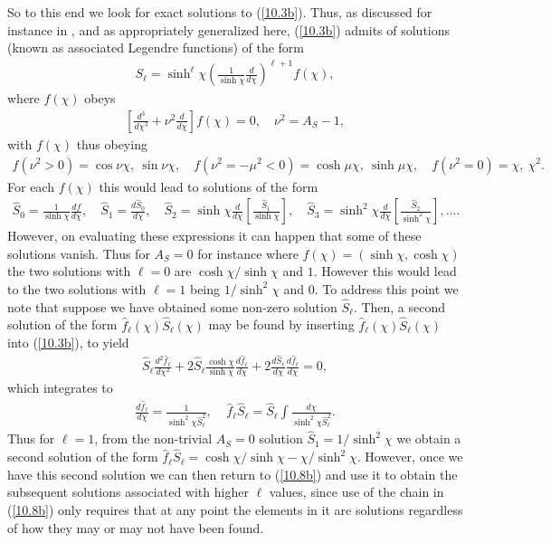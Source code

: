 \documentclass[aps,onecolumn,10pt]{revtex4}
\numberwithin{equation}{section}
\numberwithin{equation}{section}
\begin{document}
So to this end we look for exact solutions to (\ref{10.3b}). Thus,  as discussed for instance in \cite{Bander1966,Mannheim1988}, and as appropriately generalized here,  (\ref{10.3b}) 
admits of solutions (known as associated Legendre functions) of the form 
%
\begin{eqnarray}
S_{\ell}=\sinh^{\ell}\chi\left(\frac{1}{ \sinh\chi} \frac{d }{ d\chi}\right)^{\ell+1}f(\chi),
\label{10.5b}
\end{eqnarray}
%
where $f(\chi)$ obeys
%
\begin{eqnarray}
\left[\frac{d^3}{d\chi^3}+\nu^2\frac{d}{d\chi}\right]f(\chi)=0,\quad \nu^2=A_S-1,
\label{10.6b}
\end{eqnarray}
%
with $f(\chi)$ thus obeying 
%
\begin{eqnarray}
f(\nu^2>0)=\cos\nu\chi,~\sin\nu\chi,\quad f(\nu^2=-\mu^2<0)=\cosh\mu\chi,~\sinh\mu\chi,\quad f(\nu^2=0)=\chi,~\chi^2.
\label{10.7b}
\end{eqnarray}
%
For each $f(\chi)$ this would lead to solutions of the form
%
\begin{eqnarray}
\hat{S}_0=\frac{1}{\sinh\chi}\frac{df}{d\chi},\quad \hat{S}_1=\frac{d\hat{S}_0}{d\chi},\quad \hat{S}_2=\sinh\chi\frac{d}{d\chi}\left[\frac{\hat{S}_1}{\sinh\chi}\right],\quad \hat{S}_3=\sinh^2\chi\frac{d}{d\chi}\left[\frac{\hat{S}_2}{\sinh^2\chi}\right],....
\label{10.8b}
\end{eqnarray}
%
However, on evaluating these expressions it can happen that some of these solutions vanish. Thus for $A_S=0$ for instance where $f(\chi)=(\sinh\chi,\cosh\chi)$ the two solutions with $\ell=0$ are $\cosh\chi/\sinh\chi$ and $1$. However this would lead to the two solutions with $\ell=1$ being $1/\sinh^2\chi$ and $0$. To address this point we note that suppose we have obtained some non-zero solution $\hat{S}_{\ell}$. Then, a second solution of the form $\hat{f}_{\ell}(\chi)\hat{S}_{\ell}(\chi)$ may be found by inserting $\hat{f}_{\ell}(\chi)\hat{S}_{\ell}(\chi)$ into (\ref{10.3b}), to yield
%
\begin{eqnarray}
\hat{S}_{\ell}\frac{d^2 \hat{f}_{\ell}}{ d\chi^2}+2\hat{S}_{\ell}\frac{\cosh\chi }{ \sinh\chi}\frac{d \hat{f}_{\ell}}{ d\chi}+2\frac{d \hat{S}_{\ell}}{ d\chi}\frac{d \hat{f}_{\ell}}{ d\chi}=0,
\label{10.9b}
\end{eqnarray}
%
which integrates to
%
\begin{eqnarray}
\frac{d \hat{f}_{\ell}}{ d\chi}=\frac{1}{\sinh^2\chi\hat{S}_{\ell}^2},~~~~~\hat{f}_{\ell}\hat{S}_{\ell}=\hat{S}_{\ell}\int \frac{d\chi }{\sinh^2\chi\hat{S}_{\ell}^2}.
\label{10.10b}
\end{eqnarray}
%
Thus for $\ell=1$, from the non-trivial $A_S=0$ solution $\hat{S}_{1}=1/\sinh^2\chi$ we obtain a second solution of the form $\hat{f}_{\ell}\hat{S}_{\ell}=\cosh\chi/\sinh\chi-\chi/\sinh^2\chi$. However, once we have this second solution we can then return to (\ref{10.8b}) and use it to obtain the subsequent solutions associated with higher $\ell$ values, since use of the chain in (\ref{10.8b}) only requires that at any point the elements in it are solutions regardless of how they may or may not have been found.
\end{document}
